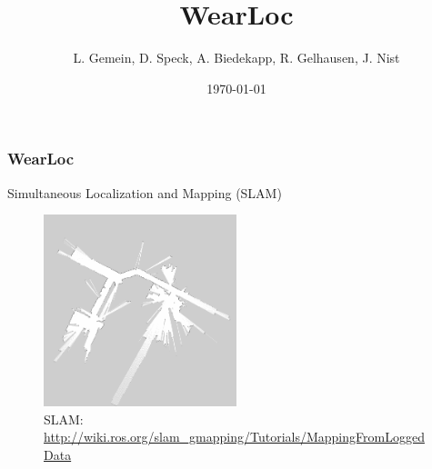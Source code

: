 \documentclass{beamer}
\title{WearLoc}
\author{L. Gemein, D. Speck, A. Biedekapp, R. Gelhausen, J. Nist}
\date{\today}
\begin{document}
\maketitle

\begin{frame} %
  \frametitle{WearLoc}%
  \begin{center}Simultaneous Localization and Mapping (SLAM)
  \end{center}
  \begin{figure}
  \includegraphics[width=0.5\textwidth]{slam.png} 
  \caption{SLAM: \url{http://wiki.ros.org/slam_gmapping/Tutorials/MappingFromLoggedData}}
  \end{figure}
\end{frame}
\end{document}
